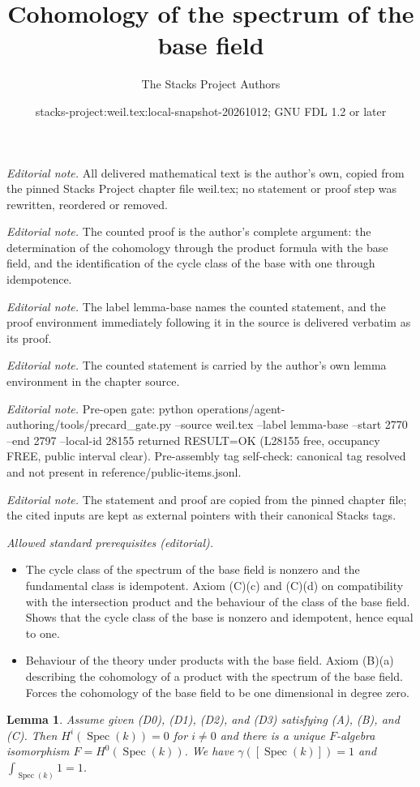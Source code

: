 \documentclass[10pt,a4paper]{amsart}
\title{Cohomology of the spectrum of the base field}
\author{The Stacks Project Authors}
\date{stacks-project:weil.tex:local-snapshot-20261012; GNU FDL 1.2 or later}
\theoremstyle{plain}
\newtheorem{lemma}[subsection]{Lemma}
\theoremstyle{definition}
\theoremstyle{remark}
\numberwithin{equation}{subsection}
\def\Spec{\mathop{\mathrm{Spec}}}
\begin{document}
\maketitle
\noindent\textit{Editorial note.} All delivered mathematical text is the author's own, copied from the pinned Stacks Project chapter file weil.tex; no statement or proof step was rewritten, reordered or removed.\par\medskip
\noindent\textit{Editorial note.} The counted proof is the author's complete argument: the determination of the cohomology through the product formula with the base field, and the identification of the cycle class of the base with one through idempotence.\par\medskip
\noindent\textit{Editorial note.} The label lemma-base names the counted statement, and the proof environment immediately following it in the source is delivered verbatim as its proof.\par\medskip
\noindent\textit{Editorial note.} The counted statement is carried by the author's own lemma environment in the chapter source.\par\medskip
\noindent\textit{Editorial note.} Pre-open gate: python operations/agent-authoring/tools/precard\_gate.py --source weil.tex --label lemma-base --start 2770 --end 2797 --local-id 28155 returned RESULT=OK (L28155 free, occupancy FREE, public interval clear). Pre-assembly tag self-check: canonical tag resolved and not present in reference/public-items.jsonl.\par\medskip
\noindent\textit{Editorial note.} The statement and proof are copied from the pinned chapter file; the cited inputs are kept as external pointers with their canonical Stacks tags.\par\medskip
\noindent\textit{Allowed standard prerequisites (editorial).}\begin{itemize}
\item The cycle class of the spectrum of the base field is nonzero and the fundamental class is idempotent. Axiom (C)(c) and (C)(d) on compatibility with the intersection product and the behaviour of the class of the base field. Shows that the cycle class of the base is nonzero and idempotent, hence equal to one.
\item Behaviour of the theory under products with the base field. Axiom (B)(a) describing the cohomology of a product with the spectrum of the base field. Forces the cohomology of the base field to be one dimensional in degree zero.
\end{itemize}\medskip
\begin{lemma}
\label{lemma-base}
Assume given (D0), (D1), (D2), and (D3) satisfying (A), (B), and (C).
Then $H^i(\Spec(k)) = 0$ for $i \not = 0$ and there is a
unique $F$-algebra isomorphism $F = H^0(\Spec(k))$.
We have $\gamma([\Spec(k)]) = 1$ and $\int_{\Spec(k)} 1 = 1$.
\end{lemma}
\end{document}
